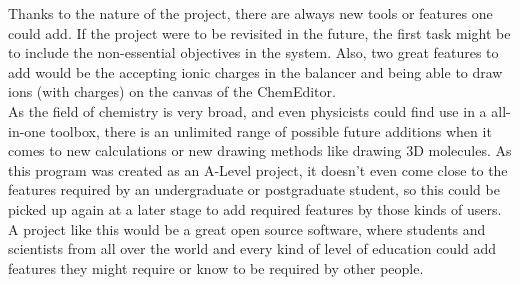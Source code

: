 \documentclass[a4paper,12pt]{article}
\begin{document}
Thanks to the nature of the project, there are always new tools or features one could add. If the project were to be revisited in the future, the first task might be to include the non-essential objectives in the system. Also, two great features to add would be the accepting ionic charges in the balancer and being able to draw ions (with charges) on the canvas of the ChemEditor.\\
As the field of chemistry is very broad, and even physicists could find use in a all-in-one toolbox, there is an unlimited range of possible future additions when it comes to new calculations or new drawing methods like drawing 3D molecules. As this program was created as an A-Level project, it doesn't even come close to the features required by an undergraduate or postgraduate student, so this could be picked up again at a later stage to add required features by those kinds of users.\\ 
A project like this would be a great open source software, where students and scientists from all over the world and every kind of level of education could add features they might require or know to be required by other people.

\newpage

\printbibliography
\end{document}
